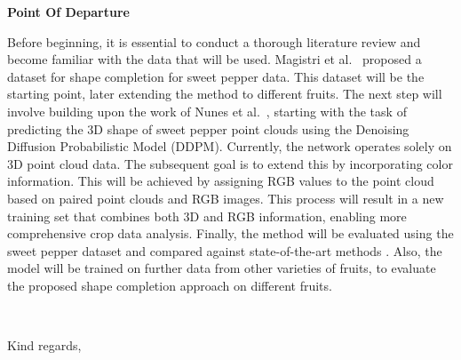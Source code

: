 \documentclass[11pt]{briefcd_3en}
\begin{document}
\begin{letter}{}
\textbf{Point Of Departure}


Before beginning, it is essential to conduct a thorough literature review 
and become familiar with the data that will be used. 
Magistri et al.~\cite{magistri2024arxiv} proposed a dataset for shape completion 
for sweet pepper data. This dataset will be the starting point, later extending 
the method to different fruits. The next step will involve building upon the work of 
Nunes et al.~\cite{nunes2024cvpr}, starting with the task of predicting the 
3D shape of sweet pepper point clouds using the Denoising Diffusion Probabilistic 
Model (DDPM). Currently, the network operates solely on 3D point cloud data. 
The subsequent goal is to extend this by incorporating color information. 
This will be achieved by assigning RGB values to the point cloud based on 
paired point clouds and RGB images. This process will result in a new training set that 
combines both 3D and RGB information, enabling more comprehensive crop data analysis.
Finally, the method will be evaluated using the sweet pepper 
dataset \cite{magistri2024arxiv} and compared against state-of-the-art methods \cite{magistri2022ral-iros}\cite{pan2023iros}. Also, the model will be trained on further data from other varieties 
of fruits, to evaluate the proposed shape completion approach on different fruits.

~\\[0.3cm]
\closing{Kind regards,}



\end{letter}
\end{document}
